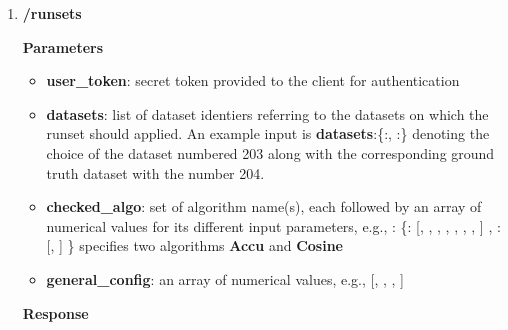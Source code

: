 \documentclass[a4paper,10pt]{scrartcl}
\newcommand{\lamine}[1]{\textcolor{blue}{#1}}
\begin{document}
\begin{enumerate}
\begin{enumerate}
\end{enumerate}
  
%
 \item \textbf{/runsets}
\textbf{Parameters}
\begin{itemize}
 \item \textbf{user\_token}: secret token provided to the client for authentication 
 \item \textbf{datasets}: list of dataset identiers referring to the datasets on which the runset should applied. An example
 input is \textbf{datasets}:\{:, :\} denoting the choice of the dataset
 numbered 203 along with the corresponding ground truth dataset with the number 204. 
 \item  \textbf{checked\_algo}: set of algorithm name(s), each followed by an array of numerical values 
 for its different input parameters, e.g., : \{: [, , , , , , , ] , : [, ] \}
specifies two algorithms \textbf{Accu} and \textbf{Cosine}
 \item \textbf{general\_config}: an array of numerical values, e.g., [, , , ]
\end{itemize}
\textbf{Response}
\end{enumerate}
\end{document}

